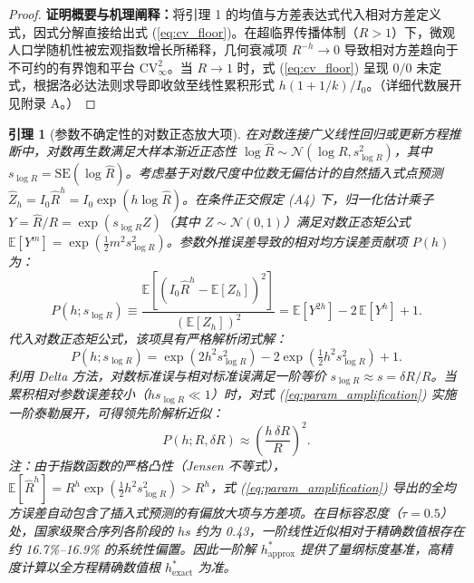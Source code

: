 \documentclass[11pt,a4paper]{article}
\theoremstyle{plain}
\newtheorem{lemma}{引理}
\theoremstyle{definition}
\begin{document}
\begin{proof}
\textbf{证明概要与机理阐释：}将引理 1 的均值与方差表达式代入相对方差定义式，因式分解直接给出式 (\ref{eq:cv_floor})。在超临界传播体制（$R > 1$）下，微观人口学随机性被宏观指数增长所稀释，几何衰减项 $R^{-h} \to 0$ 导致相对方差趋向于不可约的有界饱和平台 $\text{CV}^2_\infty$。当 $R \to 1$ 时，式 (\ref{eq:cv_floor}) 呈现 $0/0$ 未定式，根据洛必达法则求导即收敛至线性累积形式 $h(1+1/k)/I_0$。（详细代数展开见附录 A。）
\end{proof}

\begin{lemma}[参数不确定性的对数正态放大项]\label{lem:param_amplification}
在对数连接广义线性回归或更新方程推断中，对数再生数满足大样本渐近正态性 $\log \hat{R} \sim \mathcal{N}(\log R, s_{\log R}^2)$，其中 $s_{\log R} = \text{SE}(\log \hat{R})$。考虑基于对数尺度中位数无偏估计的自然插入式点预测 $\hat{Z}_h = I_0 \hat{R}^h = I_0 \exp(h \log \hat{R})$。在条件正交假定 (A4) 下，归一化估计乘子 $Y = \hat{R}/R = \exp(s_{\log R} Z)$（其中 $Z \sim \mathcal{N}(0, 1)$）满足对数正态矩公式 $\mathbb{E}[Y^m] = \exp(\tfrac{1}{2} m^2 s_{\log R}^2)$。参数外推误差导致的相对均方误差贡献项 $P(h)$ 为：
\begin{equation}
P(h; s_{\log R}) \equiv \frac{\mathbb{E}[(I_0 \hat{R}^h - \mathbb{E}[Z_h])^2]}{(\mathbb{E}[Z_h])^2} = \mathbb{E}\left[Y^{2h}\right] - 2\,\mathbb{E}\left[Y^{h}\right] + 1.
\end{equation}
代入对数正态矩公式，该项具有严格解析闭式解：
\begin{equation}
P(h; s_{\log R}) = \exp\!\left(2 h^2 s_{\log R}^2\right) - 2 \exp\!\left(\tfrac{1}{2} h^2 s_{\log R}^2\right) + 1.
\label{eq:param_amplification}
\end{equation}
利用 Delta 方法，对数标准误与相对标准误满足一阶等价 $s_{\log R} \approx s = \delta R / R$。当累积相对参数误差较小（$h s_{\log R} \ll 1$）时，对式 (\ref{eq:param_amplification}) 实施一阶泰勒展开，可得领先阶解析近似：
\begin{equation}
P(h; R, \delta R) \approx \left(\frac{h\,\delta R}{R}\right)^2.
\end{equation}
注：由于指数函数的严格凸性（Jensen 不等式），$\mathbb{E}[\hat{R}^h] = R^h \exp(\tfrac{1}{2}h^2 s_{\log R}^2) > R^h$，式 (\ref{eq:param_amplification}) 导出的全均方误差自动包含了插入式预测的有偏放大项与方差项。在目标容忍度（$\tau=0.5$）处，国家级聚合序列各阶段的 $h s$ 约为 0.43，一阶线性近似相对于精确数值根存在约 16.7\%--16.9\% 的系统性偏置。因此一阶解 $h^*_{\text{approx}}$ 提供了量纲标度基准，高精度计算以全方程精确数值根 $h^*_{\text{exact}}$ 为准。
\end{lemma}
\end{document}
